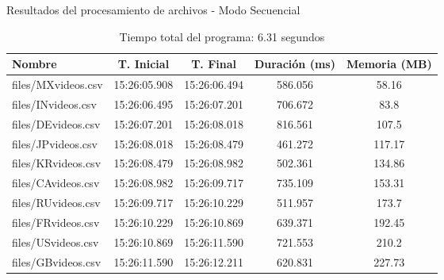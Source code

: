 \documentclass[a4paper,12pt]{report}
\begin{document}
\begin{table}[H]
\centering
\caption{Resultados del procesamiento de archivos - Modo Secuencial}
\begin{tabular}{|l|c|c|c|c|}
\hline
\textbf{Nombre}       & \textbf{T. Inicial} & \textbf{T. Final} & \textbf{Duración (ms)} & \textbf{Memoria (MB)} \\ \hline
files/MXvideos.csv    & 15:26:05.908       & 15:26:06.494     & 586.056                & 58.16                \\ \hline
files/INvideos.csv    & 15:26:06.495       & 15:26:07.201     & 706.672                & 83.8                 \\ \hline
files/DEvideos.csv    & 15:26:07.201       & 15:26:08.018     & 816.561                & 107.5                \\ \hline
files/JPvideos.csv    & 15:26:08.018       & 15:26:08.479     & 461.272                & 117.17               \\ \hline
files/KRvideos.csv    & 15:26:08.479       & 15:26:08.982     & 502.361                & 134.86               \\ \hline
files/CAvideos.csv    & 15:26:08.982       & 15:26:09.717     & 735.109                & 153.31               \\ \hline
files/RUvideos.csv    & 15:26:09.717       & 15:26:10.229     & 511.957                & 173.7                \\ \hline
files/FRvideos.csv    & 15:26:10.229       & 15:26:10.869     & 639.371                & 192.45               \\ \hline
files/USvideos.csv    & 15:26:10.869       & 15:26:11.590     & 721.553                & 210.2                \\ \hline
files/GBvideos.csv    & 15:26:11.590       & 15:26:12.211     & 620.831                & 227.73               \\ \hline
\end{tabular}
\caption*{Tiempo total del programa: 6.31 segundos}
\end{table}
\end{document}
